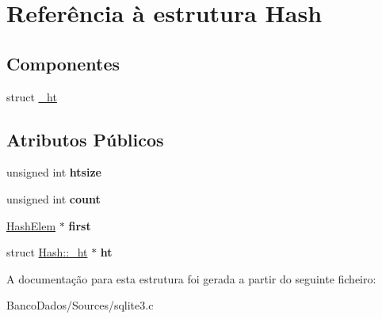 \hypertarget{struct_hash}{\section{Referência à estrutura Hash}
\label{struct_hash}
}
\subsection*{Componentes}
\begin{DoxyCompactItemize}
\item 
struct \hyperlink{struct_hash_1_1__ht}{\-\_\-ht}
\end{DoxyCompactItemize}
\subsection*{Atributos Públicos}
\begin{DoxyCompactItemize}
\item 
\hypertarget{struct_hash_a072258e24a38e09175f1308deb013bc8}{unsigned int {\bfseries htsize}}\label{struct_hash_a072258e24a38e09175f1308deb013bc8}

\item 
\hypertarget{struct_hash_a7ab16f173cdc347ffbe39eaa85ee6fda}{unsigned int {\bfseries count}}\label{struct_hash_a7ab16f173cdc347ffbe39eaa85ee6fda}

\item 
\hypertarget{struct_hash_a2cfc9936ca2a624c6492ab6557f4705b}{\hyperlink{struct_hash_elem}{Hash\-Elem} $\ast$ {\bfseries first}}\label{struct_hash_a2cfc9936ca2a624c6492ab6557f4705b}

\item 
\hypertarget{struct_hash_ac0f36e03746a3fe69643db08d93bc0c4}{struct \hyperlink{struct_hash_1_1__ht}{Hash\-::\-\_\-ht} $\ast$ {\bfseries ht}}\label{struct_hash_ac0f36e03746a3fe69643db08d93bc0c4}

\end{DoxyCompactItemize}


A documentação para esta estrutura foi gerada a partir do seguinte ficheiro\-:\begin{DoxyCompactItemize}
\item 
Banco\-Dados/\-Sources/sqlite3.\-c\end{DoxyCompactItemize}

